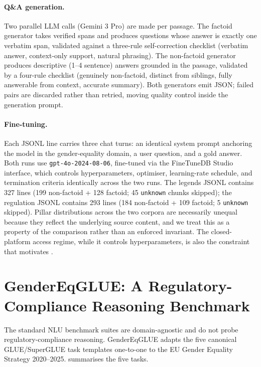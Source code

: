 \documentclass[pdflatex, sn-apa]{sn-jnl}%
\theoremstyle{thmstyleone}%
\theoremstyle{thmstyletwo}%
\theoremstyle{thmstylethree}%
\begin{document}
\paragraph{Q\&A generation.}
Two parallel LLM calls (Gemini 3 Pro) are made per passage. The factoid
generator takes verified spans and produces questions whose answer is
exactly one verbatim span, validated against a three-rule self-correction
checklist (verbatim answer, context-only support, natural phrasing). The
non-factoid generator produces descriptive (1--4 sentence) answers grounded
in the passage, validated by a four-rule checklist (genuinely non-factoid,
distinct from siblings, fully answerable from context, accurate summary).
Both generators emit JSON; failed pairs are discarded rather than retried,
moving quality control inside the generation prompt.

\paragraph{Fine-tuning.}
Each JSONL line carries three chat turns: an identical system prompt
anchoring the model in the gender-equality domain, a user question, and a
gold answer. Both runs use \texttt{gpt-4o-2024-08-06}, fine-tuned via the
FineTuneDB Studio interface, which controls hyperparameters, optimiser,
learning-rate schedule, and termination criteria identically across the
two runs. The legends JSONL contains 327 lines (199 non-factoid + 128
factoid; 45 \texttt{unknown} chunks skipped); the regulation JSONL
contains 293 lines (184 non-factoid + 109 factoid; 5 \texttt{unknown}
skipped). Pillar distributions across the two corpora are necessarily
unequal because they reflect the underlying source content, and we treat
this as a property of the comparison rather than an enforced invariant.
The closed-platform access regime, while it controls hyperparameters, is
also the constraint that motivates .

\section{GenderEqGLUE: A Regulatory-Compliance Reasoning Benchmark}
\label{sec:benchmark}

The standard NLU benchmark suites are domain-agnostic and do not probe
regulatory-compliance reasoning. GenderEqGLUE adapts the five canonical
GLUE/SuperGLUE task templates one-to-one to the EU Gender Equality
Strategy 2020--2025.  summarises the five tasks.
\end{document}
